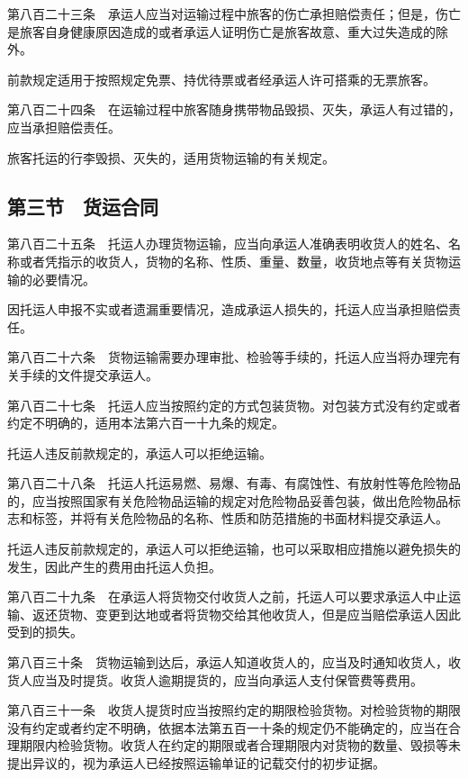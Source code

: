\documentclass[UTF8,12pt,a4paper]{ctexbook}
\begin{document}
第八百二十三条　承运人应当对运输过程中旅客的伤亡承担赔偿责任；但是，伤亡是旅客自身健康原因造成的或者承运人证明伤亡是旅客故意、重大过失造成的除外。

前款规定适用于按照规定免票、持优待票或者经承运人许可搭乘的无票旅客。

第八百二十四条　在运输过程中旅客随身携带物品毁损、灭失，承运人有过错的，应当承担赔偿责任。

旅客托运的行李毁损、灭失的，适用货物运输的有关规定。

\subsection*{第三节　货运合同}

第八百二十五条　托运人办理货物运输，应当向承运人准确表明收货人的姓名、名称或者凭指示的收货人，货物的名称、性质、重量、数量，收货地点等有关货物运输的必要情况。

因托运人申报不实或者遗漏重要情况，造成承运人损失的，托运人应当承担赔偿责任。

第八百二十六条　货物运输需要办理审批、检验等手续的，托运人应当将办理完有关手续的文件提交承运人。

第八百二十七条　托运人应当按照约定的方式包装货物。对包装方式没有约定或者约定不明确的，适用本法第六百一十九条的规定。

托运人违反前款规定的，承运人可以拒绝运输。

第八百二十八条　托运人托运易燃、易爆、有毒、有腐蚀性、有放射性等危险物品的，应当按照国家有关危险物品运输的规定对危险物品妥善包装，做出危险物品标志和标签，并将有关危险物品的名称、性质和防范措施的书面材料提交承运人。

托运人违反前款规定的，承运人可以拒绝运输，也可以采取相应措施以避免损失的发生，因此产生的费用由托运人负担。

第八百二十九条　在承运人将货物交付收货人之前，托运人可以要求承运人中止运输、返还货物、变更到达地或者将货物交给其他收货人，但是应当赔偿承运人因此受到的损失。

第八百三十条　货物运输到达后，承运人知道收货人的，应当及时通知收货人，收货人应当及时提货。收货人逾期提货的，应当向承运人支付保管费等费用。

第八百三十一条　收货人提货时应当按照约定的期限检验货物。对检验货物的期限没有约定或者约定不明确，依据本法第五百一十条的规定仍不能确定的，应当在合理期限内检验货物。收货人在约定的期限或者合理期限内对货物的数量、毁损等未提出异议的，视为承运人已经按照运输单证的记载交付的初步证据。
\end{document}

